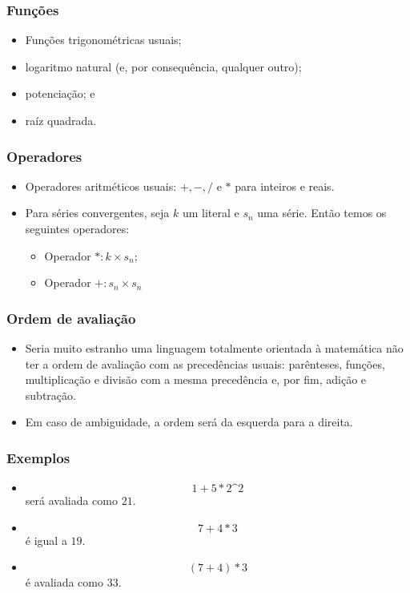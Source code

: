 \documentclass{beamer}
\begin{document}
\begin{frame}[fragile]
  \frametitle{Fun\c c\~oes}
  \begin{itemize}
  \item Fun\c c\~oes trigonom\'etricas usuais;
  \item logaritmo natural (e, por consequ\^encia, qualquer outro);
  \item potencia\c c\~ao; e
  \item ra\'iz quadrada.
  \end{itemize}
\end{frame}

\begin{frame}[fragile]
  \frametitle{Operadores}
  \begin{itemize}
  \item Operadores aritm\'eticos usuais: $+, -, /$ e $*$ para inteiros
    e reais.
  \item Para s\'eries convergentes, seja $k$ um literal e ${s_n}$ uma
    s\'erie. Ent\~ao temos os seguintes operadores:
    \begin{itemize}
    \item Operador $* : k \times {s_n}$;
    \item Operador $+ : {s_n} \times {s_n}$
    \end{itemize}
  \end{itemize}
\end{frame}

\begin{frame}[fragile]
  \frametitle{Ordem de avalia\c c\~ao}
  \begin{itemize}
  \item Seria muito estranho uma linguagem totalmente orientada \`a
    matem\'atica n\~ao ter a ordem de avalia\c c\~ao com as
    preced\^encias usuais: par\^enteses, fun\c c\~oes, multiplica\c
    c\~ao e divis\~ao com a mesma preced\^encia e, por fim, adi\c
    c\~ao e subtra\c c\~ao.
  \item Em caso de ambiguidade, a ordem ser\'a da esquerda para a direita.
  \end{itemize}
\end{frame}

\begin{frame}[fragile]
  \frametitle{Exemplos}
  \begin{itemize}
  \item
    \begin{equation}
      1 + 5 * 2 \textrm{\textasciicircum} 2
    \end{equation}
    ser\'a avaliada como $21$.
  \item \begin{equation}
      7 + 4 * 3
    \end{equation}
    \'e igual a $19$.
  \item \begin{equation}
      ( 7 + 4 ) * 3
    \end{equation}
    \'e avaliada como 33.
  \end{itemize}
\end{frame}
\end{document}
